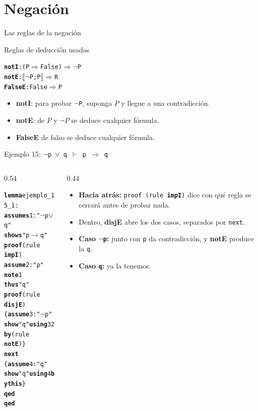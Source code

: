 \documentclass[11pt,aspectratio=169]{beamer}
\newcommand{\sOr}{\(\vee\)}
\newcommand{\sNot}{\(\neg\)}
\newcommand{\sImp}{\(\longrightarrow\)}
\newcommand{\sMeta}{\(\Longrightarrow\)}
\newcommand{\sTurn}{\(\vdash\)}
\newcommand{\sLb}{\(\llbracket\)}
\newcommand{\sRb}{\(\rrbracket\)}
\newcommand{\kw}[1]{\textcolor{isaCmd}{\textbf{#1}}}
\newcommand{\str}[1]{\textcolor{isaStr}{#1}}
\newcommand{\Rn}[1]{\textcolor{granate}{\textbf{#1}}}
\newcommand{\R}[1]{{\setlength{\fboxsep}{1pt}%
  \colorbox{resalte}{\ttfamily\bfseries\textcolor{granate}{#1}}}}
\begin{document}
\section{Negación}

\begin{frame}[fragile]{Las reglas de la negación}
  \begin{block}{Reglas de deducción usadas}
\begin{alltt}\footnotesize
\Rn{notI}:   (P \sMeta{} False) \sMeta{} \sNot P
\Rn{notE}:   \sLb\sNot P; P\sRb{} \sMeta{} R
\Rn{FalseE}: False \sMeta{} P
\end{alltt}
\end{block}
  \pause
  \begin{itemize}
    \item \Rn{notI}: para probar \texttt{\sNot P}, suponga $P$ y llegue a una
      contradicción.
    \pause
    \item \Rn{notE}: de $P$ y $\neg P$ se deduce  \alert{cualquier fórmula}.
    \pause
    \item \Rn{FalseE} de falso se deduce cualquier fórmula.
  \end{itemize}
  \vfill
\end{frame}

\begin{frame}[fragile]{Ejemplo 15: \texttt{\sNot p \sOr{} q \sTurn{} p \sImp{} q}}
  \begin{columns}[T]
    \begin{column}{0.54\textwidth}
\begin{alltt}\footnotesize
\kw{lemma} ejemplo_15_1:
  \kw{assumes} 1: \str{"\sNot p \sOr{} q"}
  \kw{shows} \str{"p \sImp{} q"}
\kw{proof} (rule \R{impI})
  \kw{assume} 2: \str{"p"}
  \kw{note} 1
  \kw{thus} \str{"q"}
  \kw{proof} (rule \R{disjE})
    \{ \kw{assume} 3: \str{"\sNot p"}
      \kw{show} \str{"q"} \kw{using} 3 2 \kw{by} (rule \R{notE}) \}
  \kw{next}
    \{ \kw{assume} 4: \str{"q"}
      \kw{show} \str{"q"} \kw{using} 4 \kw{by} \kw{this} \}
  \kw{qed}
\kw{qed}
\end{alltt}
    \end{column}
    \begin{column}{0.44\textwidth}
      \footnotesize
      \begin{itemize}
        \item<2-> \textbf{Hacia atrás:} \texttt{proof (rule \Rn{impI})}
          dice con qué regla se cerrará \alert{antes} de probar nada.
        \item<3-> Dentro, \Rn{disjE} abre los dos casos, separados por
          \texttt{next}.
        \item<4-> \textbf{Caso \texttt{\sNot p}:} junto con \texttt{p} da
          contradicción, y \Rn{notE} produce la \texttt{q}.
        \item<5-> \textbf{Caso \texttt{q}:} ya la tenemos.
      \end{itemize}
    \end{column}
  \end{columns}
\end{frame}
\end{document}
